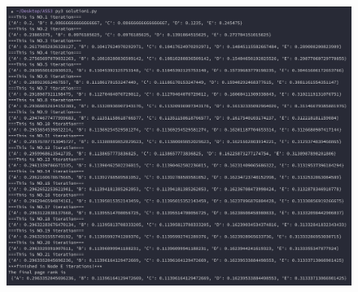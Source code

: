 \documentclass{article}
\begin{document}
\begin{figure}[H]
    \includegraphics[width=1\textwidth]{Fig3}
\end{figure}
\end{document}
